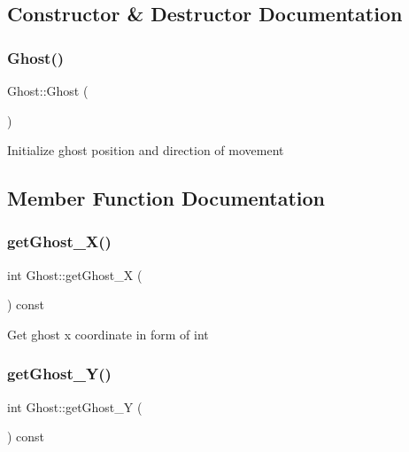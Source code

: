 \subsection{Constructor \& Destructor Documentation}
\mbox{\label{class_ghost_a2e38d3c0c8546cceb74777b49a8e3bb7}} 
\subsubsection{\texorpdfstring{Ghost()}{Ghost()}}
{\footnotesize\ttfamily Ghost\+::\+Ghost (\begin{DoxyParamCaption}{ }\end{DoxyParamCaption})}

Initialize ghost position and direction of movement 

\subsection{Member Function Documentation}
\mbox{\label{class_ghost_aedf007ec72dec676c77734d29eedb2a8}} 
\subsubsection{\texorpdfstring{get\+Ghost\+\_\+\+X()}{getGhost\_X()}}
{\footnotesize\ttfamily int Ghost\+::get\+Ghost\+\_\+X (\begin{DoxyParamCaption}{ }\end{DoxyParamCaption}) const\hspace{0.3cm}{\ttfamily [inline]}}

Get ghost x coordinate in form of int \mbox{\label{class_ghost_ae069b2ac96e5d13b5bd62cb1e75acf05}} 
\subsubsection{\texorpdfstring{get\+Ghost\+\_\+\+Y()}{getGhost\_Y()}}
{\footnotesize\ttfamily int Ghost\+::get\+Ghost\+\_\+Y (\begin{DoxyParamCaption}{ }\end{DoxyParamCaption}) const\hspace{0.3cm}{\ttfamily [inline]}}

